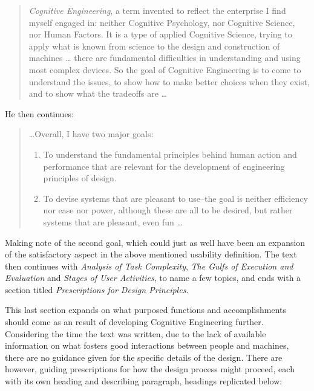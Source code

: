 \begin{quote}
  \textit{Cognitive Engineering}, a term invented to reflect the enterprise I find
  myself engaged in: neither Cognitive Psychology, nor Cognitive Science, nor
  Human Factors. It is a type of applied Cognitive Science, trying to apply
  what is known from science to the design and construction of machines \ldots
  there are fundamental difficulties in
  understanding and using most complex devices. So the goal of Cognitive
  Engineering is to come to understand the issues, to show how to make better
  choices when they exist, and to show what the tradeoffs are \ldots
\end{quote}

He then continues\cite[p. 32]{citeUserCenteredNorman}:
\begin{quote}
  \ldots Overall, I have two major goals:
  \begin{enumerate}
    \item{To understand the fundamental principles behind human action and performance that are relevant for the
    development of engineering principles of design.}
    \item{To devise systems that
    are pleasant to use--the goal is neither efficiency nor ease nor power, although
    these are all to be desired, but rather systems that are pleasant, even fun
    \ldots}
  \end{enumerate}
\end{quote}

Making note of the second goal, which could just as well have been an expansion
of the satisfactory aspect in the above mentioned usability definition. The
text then continues with
\textit{Analysis of Task Complexity},
\textit{The Gulfs of Execution and Evaluation} and
\textit{Stages of User Activities}, to name a few topics, and ends with
a section titled \textit{Prescriptions for Design Principles}.

This last section expands on what purposed functions and
accomplishments should come as an result of developing Cognitive Engineering
further.
Considering the time the text was written, due to the lack of available information on
what fosters good interactions between people and machines, there are no
guidance given for the specific details of the design. There are however,
guiding prescriptions for how the design process might proceed\cite[p.
59-61]{citeUserCenteredNorman}, each with its own heading and describing
paragraph, headings replicated below:

